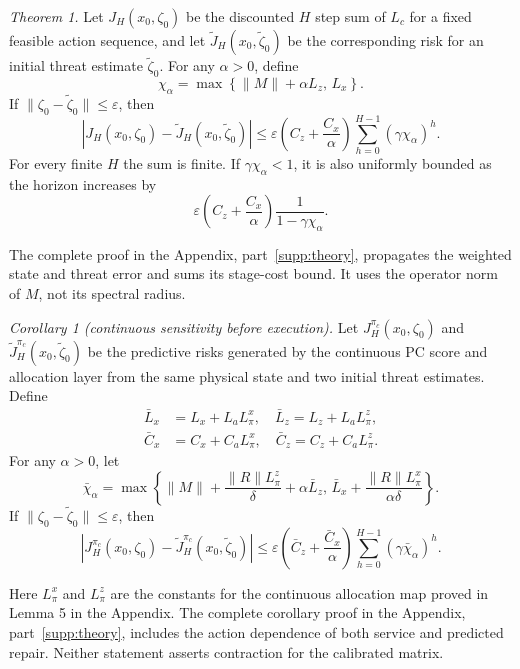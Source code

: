 \documentclass[journal]{IEEEtran}
\begin{document}
\textit{Theorem 1.}  Let $J_H(x_0,\zeta_0)$ be the discounted $H$ step sum of $L_c$ for
a fixed feasible action sequence, and let $\tilde J_H(x_0,\tilde\zeta_0)$ be the
corresponding risk for an initial threat estimate $\tilde\zeta_0$.  For any
$\alpha>0$, define
\begin{equation}
\chi_{\alpha}=
\max\left\{\|M\|+\alpha L_z,\,
L_x\right\}.
\end{equation}
If $\|\zeta_0-\tilde\zeta_0\|\le \varepsilon$, then
\begin{equation}
|J_H(x_0,\zeta_0)-\tilde J_H(x_0,\tilde\zeta_0)|
\le
\varepsilon \left(C_z+\frac{C_x}{\alpha}\right)
\sum_{h=0}^{H-1}(\gamma\chi_{\alpha})^h .
\label{eq:riskbound}
\end{equation}
For every finite $H$ the sum is finite.  If $\gamma\chi_{\alpha}<1$, it is also
uniformly bounded as the horizon increases by
\begin{equation}
\varepsilon \left(C_z+\frac{C_x}{\alpha}\right)
\frac{1}{1-\gamma\chi_{\alpha}}.
\end{equation}

The complete proof in the Appendix, part~\ref{supp:theory}, propagates
the weighted state and threat error and sums its stage-cost bound.
It uses the operator norm of $M$, not its spectral radius.

\textit{Corollary 1 (continuous sensitivity before execution).}  Let
$J_H^{\pi_c}(x_0,\zeta_0)$ and
$\tilde J_H^{\pi_c}(x_0,\tilde\zeta_0)$ be the predictive risks generated by
the continuous PC score and allocation layer from the same physical state and
two initial threat estimates.  Define
\begin{align}
\bar L_x&=L_x+L_aL_{\pi}^x,\quad
\bar L_z=L_z+L_aL_{\pi}^{z},\\
\bar C_x&=C_x+C_aL_{\pi}^x,\quad
\bar C_z=C_z+C_aL_{\pi}^{z}.
\end{align}
For any $\alpha>0$, let
\begin{equation}
\bar\chi_{\alpha}=
\max\left\{\|M\|+\frac{\|R\|L_{\pi}^{z}}{\delta}+\alpha\bar L_z,\,
\bar L_x+\frac{\|R\|L_{\pi}^{x}}{\alpha\delta}\right\}.
\end{equation}
If $\|\zeta_0-\tilde\zeta_0\|\le\varepsilon$, then
\begin{equation}
|J_H^{\pi_c}(x_0,\zeta_0)-\tilde J_H^{\pi_c}(x_0,\tilde\zeta_0)|
\le
\varepsilon\left(\bar C_z+\frac{\bar C_x}{\alpha}\right)
\sum_{h=0}^{H-1}(\gamma\bar\chi_{\alpha})^h .
\end{equation}

Here $L_\pi^x$ and $L_\pi^z$ are the constants for the continuous allocation
map proved in Lemma 5 in the Appendix. The complete corollary proof in
the Appendix, part~\ref{supp:theory}, includes the action dependence of
both service and predicted repair.  Neither statement asserts contraction
for the calibrated matrix.
\end{document}
